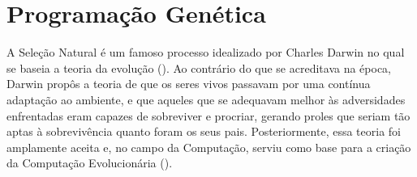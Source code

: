 


\section{Programação Genética}
\label{sec::pg}

A Seleção Natural é um famoso processo idealizado por Charles Darwin no qual se baseia a teoria da evolução (\cite{Darwin1859}). Ao contrário do que se acreditava na época, Darwin propôs a teoria de que os seres vivos passavam por uma contínua adaptação ao ambiente, e que aqueles que se adequavam melhor às adversidades enfrentadas eram capazes de sobreviver e procriar, gerando proles que seriam tão aptas à sobrevivência quanto foram os seus pais.
Posteriormente, essa teoria foi amplamente aceita e, no campo da Computação, serviu como base para a criação da Computação Evolucionária (\cite{Goldberg89}).

